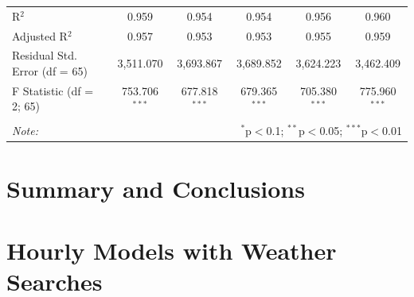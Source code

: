 \documentclass{article}
\begin{document}
\begin{table}[!htbp]
\begin{tabular}{@{\extracolsep{5pt}}lccccc}
R$^{2}$ & 0.959 & 0.954 & 0.954 & 0.956 & 0.960 \\ 
Adjusted R$^{2}$ & 0.957 & 0.953 & 0.953 & 0.955 & 0.959 \\ 
Residual Std. Error (df = 65) & 3,511.070 & 3,693.867 & 3,689.852 & 3,624.223 & 3,462.409 \\ 
F Statistic (df = 2; 65) & 753.706$^{***}$ & 677.818$^{***}$ & 679.365$^{***}$ & 705.380$^{***}$ & 775.960$^{***}$ \\ 
\hline 
\hline \\[-1.8ex] 
\textit{Note:}  & \multicolumn{5}{r}{$^{*}$p$<$0.1; $^{**}$p$<$0.05; $^{***}$p$<$0.01} \\ 
\end{tabular} 
\end{table} 


\section{Summary and Conclusions}


\appendix

\section{Hourly Models with Weather Searches}
\end{document}
